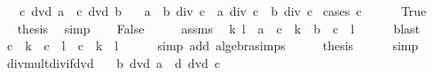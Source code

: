 \begin{isabellebody}
\ \ \ {\isachardoublequoteopen}c\ dvd\ a{\isachardoublequoteclose}\ \ {\isachardoublequoteopen}c\ dvd\ b{\isachardoublequoteclose}\isanewline
\ \ \ {\isachardoublequoteopen}{\isacharparenleft}{\kern0pt}a\ {\isacharplus}{\kern0pt}\ b{\isacharparenright}{\kern0pt}\ div\ c\ {\isacharequal}{\kern0pt}\ a\ div\ c\ {\isacharplus}{\kern0pt}\ b\ div\ c{\isachardoublequoteclose}\isanewline
%
\isadelimproof
%
\endisadelimproof
%
\isatagproof
{}\isamarkupfalse%
\ {\isacharparenleft}{\kern0pt}cases\ {\isachardoublequoteopen}c\ {\isacharequal}{\kern0pt}\ {}{\isachardoublequoteclose}{\isacharparenright}{\kern0pt}\isanewline
\ \ \isamarkupfalse%
\ True\isanewline
\ \ \isamarkupfalse%
\ \isamarkupfalse%
\ {\isacharquery}{\kern0pt}thesis\ \isamarkupfalse%
\ simp\isanewline
{}\isamarkupfalse%
\isanewline
\ \ \isamarkupfalse%
\ False\isanewline
\ \ \isamarkupfalse%
\ \isamarkupfalse%
\ assms\ \isamarkupfalse%
\ k\ l\ \ {\isachardoublequoteopen}a\ {\isacharequal}{\kern0pt}\ c\ {\isacharasterisk}{\kern0pt}\ k{\isachardoublequoteclose}\ \ {\isachardoublequoteopen}b\ {\isacharequal}{\kern0pt}\ c\ {\isacharasterisk}{\kern0pt}\ l{\isachardoublequoteclose}\isanewline
\ \ \ \ \isamarkupfalse%
\ blast\isanewline
\ \ \isamarkupfalse%
\ \isamarkupfalse%
\ {\isachardoublequoteopen}c\ {\isacharasterisk}{\kern0pt}\ k\ {\isacharplus}{\kern0pt}\ c\ {\isacharasterisk}{\kern0pt}\ l\ {\isacharequal}{\kern0pt}\ c\ {\isacharasterisk}{\kern0pt}\ {\isacharparenleft}{\kern0pt}k\ {\isacharplus}{\kern0pt}\ l{\isacharparenright}{\kern0pt}{\isachardoublequoteclose}\isanewline
\ \ \ \ \isamarkupfalse%
\ {\isacharparenleft}{\kern0pt}simp\ add{\isacharcolon}{\kern0pt}\ algebra{\isacharunderscore}{\kern0pt}simps{\isacharparenright}{\kern0pt}\isanewline
\ \ \isamarkupfalse%
\ \isamarkupfalse%
\ {\isacharquery}{\kern0pt}thesis\isanewline
\ \ \ \ \isamarkupfalse%
\ simp\isanewline
{}\isamarkupfalse%
%
\endisatagproof
{\isafoldproof}%
%
\isadelimproof
\isanewline
%
\endisadelimproof
\isanewline
{}\isamarkupfalse%
\ div{\isacharunderscore}{\kern0pt}mult{\isacharunderscore}{\kern0pt}div{\isacharunderscore}{\kern0pt}if{\isacharunderscore}{\kern0pt}dvd{\isacharcolon}{\kern0pt}\isanewline
\ \ \ {\isachardoublequoteopen}b\ dvd\ a{\isachardoublequoteclose}\ \ {\isachardoublequoteopen}d\ dvd\ c{\isachardoublequoteclose}\isanewline

\end{isabellebody}
